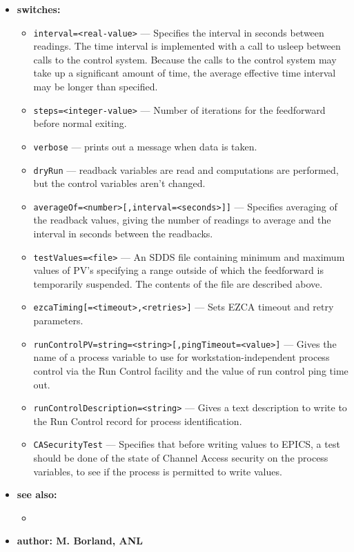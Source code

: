 \begin{itemize}
%
\item {\bf switches:}
%
%
    \begin{itemize}
        \item {\tt interval=<real-value>} --- Specifies the interval in seconds between readings. The time
                interval is implemented with a call to usleep between calls to the control system.
                Because the calls to the control system may take up a significant amount of time, the average
                effective time interval may be longer than specified. 
        \item {\tt steps=<integer-value>} --- Number of iterations for the feedforward before normal exiting.
        \item {\tt verbose} --- prints out a message when data is taken.
        \item {\tt dryRun} --- readback variables are read and computations are performed, 
        but the control variables aren't changed.
        \item {\tt averageOf=<number>[,interval=<seconds>]]} --- Specifies averaging of the
        readback values, giving the number of readings to average and the interval in seconds
        between the readbacks.
        \item {\tt testValues=<file>} --- An SDDS file containing minimum and maximum values
        of PV's specifying a range outside of which the feedforward
        is temporarily suspended. The contents of the file are
        described above.
        \item {\tt ezcaTiming[=<timeout>,<retries>]} --- Sets EZCA timeout and retry parameters.
        \item {\tt runControlPV=string=<string>[,pingTimeout=<value>]} --- Gives the name of a process variable to use for
        workstation-independent process control via the Run Control facility and the value of run control ping time out.
        \item {\tt runControlDescription=<string>} --- Gives a text description to write to
        the Run Control record for process identification.
        \item {\tt CASecurityTest} --- Specifies that before writing values to EPICS, a
        test should be done of the state of Channel Access security on the process variables,
        to see if the process is permitted to write values.
    \end{itemize}

\item {\bf see also:}
    \begin{itemize}
%
%
    \item {}
    \end{itemize}
%
%
\item {\bf author: M. Borland, ANL}
\end{itemize}
